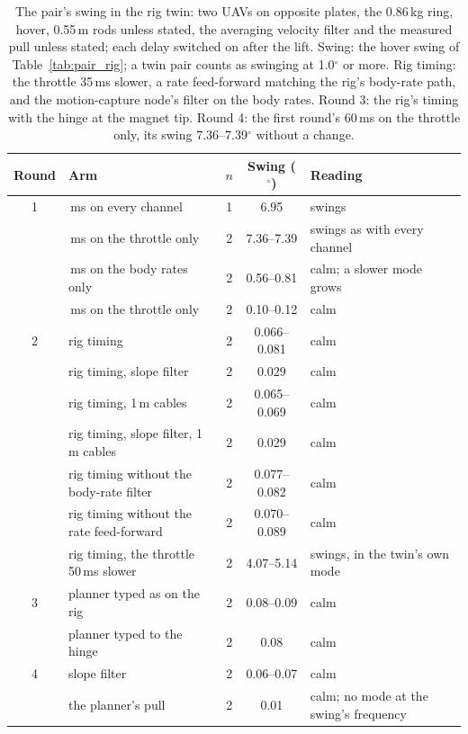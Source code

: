 \begin{table}[htbp]
\centering
\footnotesize
\setlength{\tabcolsep}{3pt}
\caption[The pair's swing in the twin]{The pair's swing in the rig twin: two UAVs on opposite plates, the 0.86\,kg
ring, hover, 0.55\,m rods unless stated, the averaging velocity filter and the measured pull unless stated; each delay
switched on after the lift. Swing: the hover swing of Table~\ref{tab:pair_rig}; a twin pair counts as swinging at
1.0$^\circ$ or more. Rig timing: the throttle 35\,ms slower, a rate feed-forward matching the rig's body-rate path, and
the motion-capture node's filter on the body rates. Round 3: the rig's timing with the hinge at the magnet tip. Round
4: the first round's 60\,ms on the throttle only, its swing 7.36--7.39$^\circ$ without a change.}
\label{tab:pair_twin}
\begin{tabularx}{\textwidth}{c>{\raggedright\arraybackslash}Xccl}
\toprule
Round & Arm & $n$ & Swing ($^\circ$) & Reading \\
\midrule
1 & 60\,ms on every channel & 1 & 6.95 & swings \\
 & 60\,ms on the throttle only & 2 & 7.36--7.39 & swings as with every channel \\
 & 60\,ms on the body rates only & 2 & 0.56--0.81 & calm; a slower mode grows \\
 & 40\,ms on the throttle only & 2 & 0.10--0.12 & calm \\
\midrule
2 & rig timing & 2 & 0.066--0.081 & calm \\
 & rig timing, slope filter & 2 & 0.029 & calm \\
 & rig timing, 1\,m cables & 2 & 0.065--0.069 & calm \\
 & rig timing, slope filter, 1\,m cables & 2 & 0.029 & calm \\
 & rig timing without the body-rate filter & 2 & 0.077--0.082 & calm \\
 & rig timing without the rate feed-forward & 2 & 0.070--0.089 & calm \\
 & rig timing, the throttle 50\,ms slower & 2 & 4.07--5.14 & swings, in the twin's own mode \\
\midrule
3 & planner typed as on the rig & 2 & 0.08--0.09 & calm \\
 & planner typed to the hinge & 2 & 0.08 & calm \\
\midrule
4 & slope filter & 2 & 0.06--0.07 & calm \\
 & the planner's pull & 2 & 0.01 & calm; no mode at the swing's frequency \\
\bottomrule
\end{tabularx}
\end{table}
